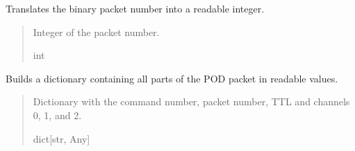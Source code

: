 \documentclass[letterpaper,10pt,english]{sphinxmanual}
\begin{document}
\begin{fulllineitems}
\begin{fulllineitems}
\begin{quote}
\begin{description}
\end{description}\end{quote}

\end{fulllineitems}


\begin{fulllineitems}
\label{\detokenize{Morelia.Packets:Morelia.Packets.Binary4.PacketBinary4.PacketNumber}}
\pysigstartsignatures
{}
\pysigstopsignatures
\sphinxAtStartPar
Translates the binary packet number into a readable integer.
\begin{quote}\begin{description}
\sphinxAtStartPar
Integer of the packet number.

\sphinxAtStartPar
int

\end{description}\end{quote}

\end{fulllineitems}


\begin{fulllineitems}
\label{\detokenize{Morelia.Packets:Morelia.Packets.Binary4.PacketBinary4.TranslateAll}}
\pysigstartsignatures
{}
\pysigstopsignatures
\sphinxAtStartPar
Builds a dictionary containing all parts of the POD packet in readable values.
\begin{quote}\begin{description}
\sphinxAtStartPar
Dictionary with the command number, packet number, TTL                 and channels 0, 1, and 2.

\sphinxAtStartPar
dict{[}str, Any{]}

\end{description}\end{quote}


\end{fulllineitems}
\end{fulllineitems}
\end{document}
